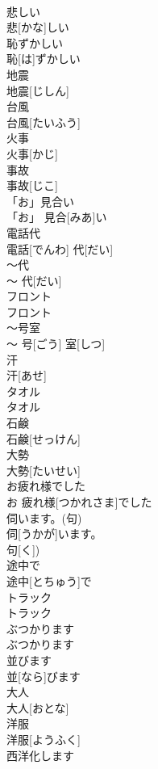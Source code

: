 \documentclass[8pt]{extreport}
\begin{document}
\begin{CJK}{UTF8}{min}
\\	悲しい	
\\	悲[かな]しい	
\\	恥ずかしい	
\\	恥[は]ずかしい	
\\	地震	
\\	地震[じしん]	
\\	台風	
\\	台風[たいふう]	
\\	火事	
\\	火事[かじ]	
\\	事故	
\\	事故[じこ]	
\\	「お」見合い	
\\	「お」 見合[みあ]い	
\\	電話代	
\\	電話[でんわ] 代[だい]	
\\	〜代	
\\	〜 代[だい]	
\\	フロント	
\\	フロント	
\\	〜号室	
\\	〜 号[ごう] 室[しつ]	
\\	汗	
\\	汗[あせ]	
\\	タオル	
\\	タオル	
\\	石鹸	
\\	石鹸[せっけん]	
\\	大勢	
\\	大勢[たいせい]	
\\	お疲れ様でした	
\\	お 疲れ様[つかれさま]でした	
\\	伺います。(句)	
\\	伺[うかが]います。
\\	句[く])	
\\	途中で	
\\	途中[とちゅう]で	
\\	トラック	
\\	トラック	
\\	ぶつかります	
\\	ぶつかります	
\\	並びます	
\\	並[なら]びます	
\\	大人	
\\	大人[おとな]	
\\	洋服	
\\	洋服[ようふく]	
\\	西洋化します	

\end{CJK}
\end{document}
